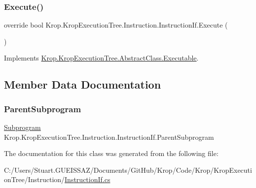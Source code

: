 \subsubsection{\texorpdfstring{Execute()}{Execute()}}
{\footnotesize\ttfamily override bool Krop.\+Krop\+Execution\+Tree.\+Instruction.\+Instruction\+If.\+Execute (\begin{DoxyParamCaption}{ }\end{DoxyParamCaption})\hspace{0.3cm}{\ttfamily [virtual]}}



Implements \mbox{\hyperlink{class_krop_1_1_krop_execution_tree_1_1_abstract_class_1_1_executable_ac32692ce44b5f938a90111ee27e7b684}{Krop.\+Krop\+Execution\+Tree.\+Abstract\+Class.\+Executable}}.



\subsection{Member Data Documentation}
\mbox{\label{class_krop_1_1_krop_execution_tree_1_1_instruction_1_1_instruction_if_ac302196115aed8fe5c9f79cb6a6d7747}} 
\subsubsection{\texorpdfstring{Parent\+Subprogram}{ParentSubprogram}}
{\footnotesize\ttfamily \mbox{\hyperlink{class_krop_1_1_krop_execution_tree_1_1_subprogram}{Subprogram}} Krop.\+Krop\+Execution\+Tree.\+Instruction.\+Instruction\+If.\+Parent\+Subprogram}



The documentation for this class was generated from the following file\+:\begin{DoxyCompactItemize}
\item 
C\+:/\+Users/\+Stuart.\+G\+U\+E\+I\+S\+S\+A\+Z/\+Documents/\+Git\+Hub/\+Krop/\+Code/\+Krop/\+Krop\+Execution\+Tree/\+Instruction/\mbox{\hyperlink{_instruction_if_8cs}{Instruction\+If.\+cs}}\end{DoxyCompactItemize}
